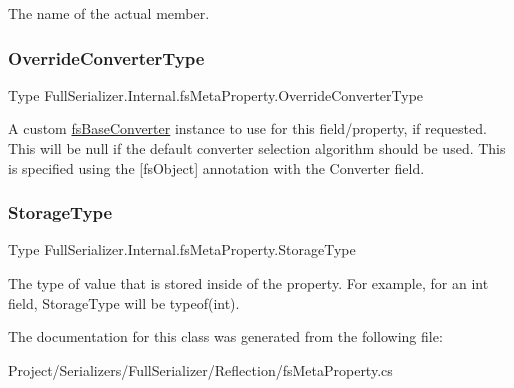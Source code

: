 The name of the actual member. 

\mbox{\label{class_full_serializer_1_1_internal_1_1fs_meta_property_a6c973be921f0432b68d33cb1fab4e22e}} 
\subsubsection{\texorpdfstring{Override\+Converter\+Type}{OverrideConverterType}}
{\footnotesize\ttfamily Type Full\+Serializer.\+Internal.\+fs\+Meta\+Property.\+Override\+Converter\+Type\hspace{0.3cm}{\ttfamily [get]}}



A custom \hyperlink{class_full_serializer_1_1fs_base_converter}{fs\+Base\+Converter} instance to use for this field/property, if requested. This will be null if the default converter selection algorithm should be used. This is specified using the \mbox{[}fs\+Object\mbox{]} annotation with the Converter field. 

\mbox{\label{class_full_serializer_1_1_internal_1_1fs_meta_property_a5476e7a183ff2ccee14d5dce5d990f3a}} 
\subsubsection{\texorpdfstring{Storage\+Type}{StorageType}}
{\footnotesize\ttfamily Type Full\+Serializer.\+Internal.\+fs\+Meta\+Property.\+Storage\+Type\hspace{0.3cm}{\ttfamily [get]}}



The type of value that is stored inside of the property. For example, for an int field, Storage\+Type will be typeof(int). 



The documentation for this class was generated from the following file\+:\begin{DoxyCompactItemize}
\item 
Project/\+Serializers/\+Full\+Serializer/\+Reflection/fs\+Meta\+Property.\+cs\end{DoxyCompactItemize}
